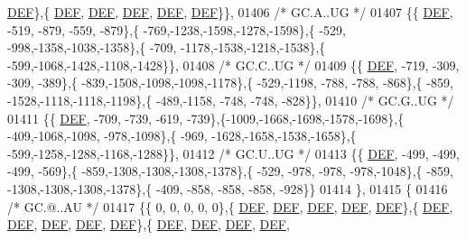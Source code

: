 \begin{DoxyCode}
      \mbox{\hyperlink{1_88_84__epars_8h_a397419fc12b37ed479c8abb9d444d843}{DEF}}\},\{  \mbox{\hyperlink{1_88_84__epars_8h_a397419fc12b37ed479c8abb9d444d843}{DEF}},  \mbox{\hyperlink{1_88_84__epars_8h_a397419fc12b37ed479c8abb9d444d843}{DEF}},  \mbox{\hyperlink{1_88_84__epars_8h_a397419fc12b37ed479c8abb9d444d843}{DEF}},  \mbox{\hyperlink{1_88_84__epars_8h_a397419fc12b37ed479c8abb9d444d843}{DEF}},  \mbox{\hyperlink{1_88_84__epars_8h_a397419fc12b37ed479c8abb9d444d843}{DEF}}\}\},
01406 \textcolor{comment}{/* GC.A..UG */}
01407 \{\{  \mbox{\hyperlink{1_88_84__epars_8h_a397419fc12b37ed479c8abb9d444d843}{DEF}}, -519, -879, -559, -879\},\{ -769,-1238,-1598,-1278,-1598\},\{ -529, -998,-1358,-1038,-1358\},\{ -709,
      -1178,-1538,-1218,-1538\},\{ -599,-1068,-1428,-1108,-1428\}\},
01408 \textcolor{comment}{/* GC.C..UG */}
01409 \{\{  \mbox{\hyperlink{1_88_84__epars_8h_a397419fc12b37ed479c8abb9d444d843}{DEF}}, -719, -309, -309, -389\},\{ -839,-1508,-1098,-1098,-1178\},\{ -529,-1198, -788, -788, -868\},\{ -859,
      -1528,-1118,-1118,-1198\},\{ -489,-1158, -748, -748, -828\}\},
01410 \textcolor{comment}{/* GC.G..UG */}
01411 \{\{  \mbox{\hyperlink{1_88_84__epars_8h_a397419fc12b37ed479c8abb9d444d843}{DEF}}, -709, -739, -619, -739\},\{-1009,-1668,-1698,-1578,-1698\},\{ -409,-1068,-1098, -978,-1098\},\{ -969,
      -1628,-1658,-1538,-1658\},\{ -599,-1258,-1288,-1168,-1288\}\},
01412 \textcolor{comment}{/* GC.U..UG */}
01413 \{\{  \mbox{\hyperlink{1_88_84__epars_8h_a397419fc12b37ed479c8abb9d444d843}{DEF}}, -499, -499, -499, -569\},\{ -859,-1308,-1308,-1308,-1378\},\{ -529, -978, -978, -978,-1048\},\{ -859,
      -1308,-1308,-1308,-1378\},\{ -409, -858, -858, -858, -928\}\}
01414 \},
01415 \{
01416 \textcolor{comment}{/* GC.@..AU */}
01417 \{\{    0,    0,    0,    0,    0\},\{  \mbox{\hyperlink{1_88_84__epars_8h_a397419fc12b37ed479c8abb9d444d843}{DEF}},  \mbox{\hyperlink{1_88_84__epars_8h_a397419fc12b37ed479c8abb9d444d843}{DEF}},  \mbox{\hyperlink{1_88_84__epars_8h_a397419fc12b37ed479c8abb9d444d843}{DEF}},  \mbox{\hyperlink{1_88_84__epars_8h_a397419fc12b37ed479c8abb9d444d843}{DEF}},  \mbox{\hyperlink{1_88_84__epars_8h_a397419fc12b37ed479c8abb9d444d843}{DEF}}\},\{  
      \mbox{\hyperlink{1_88_84__epars_8h_a397419fc12b37ed479c8abb9d444d843}{DEF}},  \mbox{\hyperlink{1_88_84__epars_8h_a397419fc12b37ed479c8abb9d444d843}{DEF}},  \mbox{\hyperlink{1_88_84__epars_8h_a397419fc12b37ed479c8abb9d444d843}{DEF}},  \mbox{\hyperlink{1_88_84__epars_8h_a397419fc12b37ed479c8abb9d444d843}{DEF}},  \mbox{\hyperlink{1_88_84__epars_8h_a397419fc12b37ed479c8abb9d444d843}{DEF}}\},\{  \mbox{\hyperlink{1_88_84__epars_8h_a397419fc12b37ed479c8abb9d444d843}{DEF}},  \mbox{\hyperlink{1_88_84__epars_8h_a397419fc12b37ed479c8abb9d444d843}{DEF}},  \mbox{\hyperlink{1_88_84__epars_8h_a397419fc12b37ed479c8abb9d444d843}{DEF}},  \mbox{\hyperlink{1_88_84__epars_8h_a397419fc12b37ed479c8abb9d444d843}{DEF}},  

\end{DoxyCode}
